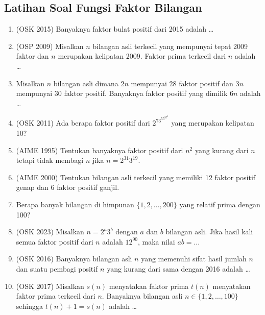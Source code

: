 \subsection{Latihan Soal Fungsi Faktor Bilangan}
\begin{enumerate}
    \item (OSK 2015) Banyaknya faktor bulat positif dari 2015 adalah \ldots

    \item (OSP 2009) Misalkan $n$ bilangan asli terkecil yang mempunyai tepat 2009 faktor dan $n$ merupakan kelipatan 2009. Faktor prima terkecil dari $n$ adalah \dots
    
    \item Misalkan $n$ bilangan asli dimana $2n$ mempunyai 28 faktor positif dan $3n$ mempunyai 30 faktor positif. Banyaknya faktor positif yang dimilik $6n$ adalah \dots
    
    \item (OSK 2011) Ada berapa faktor positif dari $2^73^55^37^2$ yang merupakan kelipatan 10?
    
    \item (AIME 1995) Tentukan banyaknya faktor positif dari $n^2$ yang kurang dari $n$ tetapi tidak membagi $n$ jika $n={2^{31}}3^{19}.$
    
    \item (AIME 2000) Tentukan bilangan asli terkecil yang memiliki 12 faktor positif genap dan $6$ faktor positif ganjil.

    \item Berapa banyak bilangan di himpunan $\{1,2,\dots,200\}$ yang relatif prima dengan 100?

    \item (OSK 2023) Misalkan $n=2^a3^b$ dengan $a$ dan $b$ bilangan asli. Jika hasil kali semua faktor positif dari $n$ adalah $12^{90}$, maka nilai $ab = \ldots$ 

    \item (OSK 2016) Banyaknya bilangan asli $n$ yang memenuhi sifat hasil jumlah $n$ dan suatu pembagi positif $n$  yang kurang dari sama dengan 2016 adalah \dots

    \item (OSK 2017) Misalkan $s(n)$ menyatakan faktor prima $t(n)$ menyatakan faktor prima terkecil dari $n$. Banyaknya bilangan asli $n \in \{1,2,\dots,100\}$ sehingga $t(n)+1=s(n)$ adalah \dots
\end{enumerate}